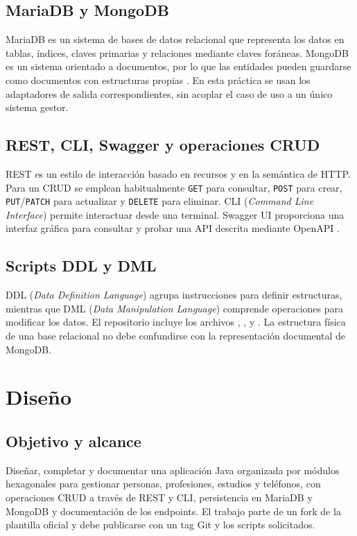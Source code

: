 \documentclass[11pt,a4paper]{article}
\begin{document}
\subsection{MariaDB y MongoDB}
MariaDB es un sistema de bases de datos relacional que representa los datos
en tablas, índices, claves primarias y relaciones mediante claves foráneas.
MongoDB es un sistema orientado a documentos, por lo que las entidades pueden
guardarse como documentos con estructuras propias \cite{mariadb,mongodb}.
En esta práctica se usan los adaptadores de salida correspondientes, sin
acoplar el caso de uso a un único sistema gestor.

\subsection{REST, CLI, Swagger y operaciones CRUD}
REST es un estilo de interacción basado en recursos y en la semántica de HTTP.
Para un CRUD se emplean habitualmente \texttt{GET} para consultar,
\texttt{POST} para crear, \texttt{PUT}/\texttt{PATCH} para actualizar y
\texttt{DELETE} para eliminar. CLI (\emph{Command Line Interface}) permite
interactuar desde una terminal. Swagger UI proporciona una interfaz gráfica
para consultar y probar una API descrita mediante OpenAPI \cite{openapi}.

\subsection{Scripts DDL y DML}
DDL (\emph{Data Definition Language}) agrupa instrucciones para definir
estructuras, mientras que DML (\emph{Data Manipulation Language}) comprende
operaciones para modificar los datos. El repositorio incluye los archivos
, ,
 y .
La estructura física de una base relacional no debe confundirse con la
representación documental de MongoDB.

\section{Diseño}

\subsection{Objetivo y alcance}
Diseñar, completar y documentar una aplicación Java organizada por módulos
hexagonales para gestionar personas, profesiones, estudios y teléfonos,
con operaciones CRUD a través de REST y CLI, persistencia en MariaDB y MongoDB
y documentación de los endpoints. El trabajo parte de un fork de la plantilla
oficial y debe publicarse con un tag Git y los scripts solicitados.
\end{document}
